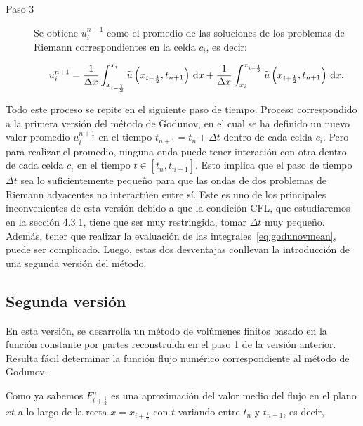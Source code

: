 \begin{description}
  \item[Paso 3]

        Se obtiene $u^{n+1}_{i}$ como el promedio de las soluciones
        de los problemas de Riemann correspondientes en la celda
        $c_{i}$, es decir:

        \begin{equation}\label{eq:godunovmean}
          u^{n+1}_{i}=
          \frac{1}{\Delta x}
          \int_{x_{i-\frac{1}{2}}}^{x_{i}}
          \widetilde{u}
          \left(x_{i-\frac{1}{2}},t_{n+1}\right)
          \dl x+
          \frac{1}{\Delta x}
          \int_{x_{i}}^{x_{i+\frac{1}{2}}}
          \widetilde{u}
          \left(
          x_{i+\frac{1}{2}},t_{n+1}
          \right)
          \dl x.
        \end{equation}
\end{description}

Todo este proceso se repite en el siguiente paso de tiempo.
Proceso correspondido a la primera versión del método de Godunov, en
el cual se ha definido un nuevo valor promedio $u^{n+1}_{i}$ en el
tiempo $t_{n+1}=t_{n}+\Delta t$ dentro de cada celda $c_{i}$.
Pero para realizar el promedio, ninguna onda puede tener interación
con otra dentro de cada celda $c_{i}$ en el tiempo
$t\in\left[t_{n},t_{n+1}\right]$.
Esto implica que el paso de tiempo $\Delta t$ sea lo suficientemente
pequeño para que las ondas de dos problemas de Riemann adyacentes no
interactúen entre sí.
Este es uno de los principales inconvenientes de esta versión debido
a que la condición CFL, que estudiaremos en la sección 4.3.1, tiene
que ser muy restringida, tomar $\Delta t$ muy pequeño.
Además, tener que realizar la evaluación de las
integrales~\eqref{eq:godunovmean}, puede ser complicado.
Luego, estas dos desventajas conllevan la introducción de una segunda
versión del método.

\subsection{Segunda versión}

En esta versión, se desarrolla un método de volúmenes finitos basado
en la función constante por partes reconstruida en el paso 1 de la
versión anterior.
Resulta fácil determinar la función flujo numérico correspondiente al
método de Godunov.

Como ya sabemos $F^{n}_{i+\frac{1}{2}}$ es una aproximación del valor
medio del flujo en el plano $xt$ a lo largo de la recta
$x=x_{i+\frac{1}{2}}$ con $t$ variando entre $t_{n}$ y $t_{n+1}$,
es decir,


